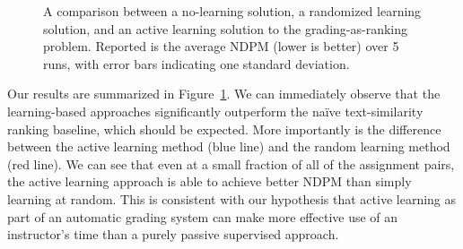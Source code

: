 \begin{figure}
  \begin{center}
  \caption{A comparison between a no-learning solution, a randomized
  learning solution, and an active learning solution to the
  grading-as-ranking problem. Reported is the average NDPM (lower is
  better) over 5 runs, with error bars indicating one standard deviation.}
  \label{fig:active-learning}
  \end{center}
\end{figure}

Our results are summarized in Figure~\ref{fig:active-learning}. We can
immediately observe that the learning-based approaches significantly
outperform the na\"ive text-similarity ranking baseline, which should be
expected. More importantly is the difference between the active learning
method (blue line) and the random learning method (red line). We can see
that even at a small fraction of all of the assignment pairs, the active
learning approach is able to achieve better NDPM than simply learning at
random. This is consistent with our hypothesis that active learning as part
of an automatic grading system can make more effective use of an
instructor's time than a purely passive supervised approach.

